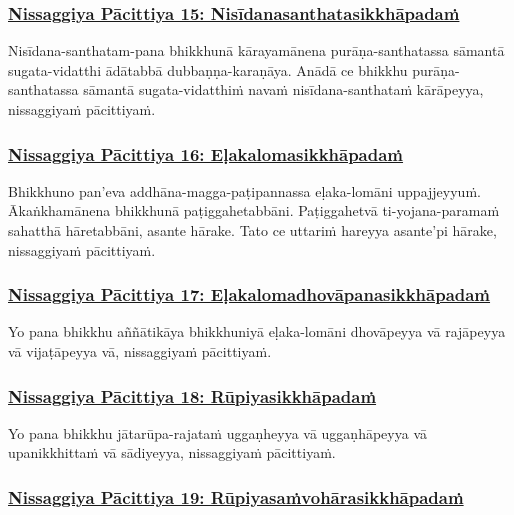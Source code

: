 \subsubsection*{\hyperref[forf-exp15]{Nissaggiya Pācittiya 15: Nisīdanasanthatasikkhāpadaṁ}}
\label{np15}

Nisīdana-santhatam-pana bhikkhunā kārayamānena purāṇa-santhatassa sāmantā sugata-vidatthi ādātabbā dubbaṇṇa-karaṇāya. Anādā ce bhikkhu purāṇa-santhatassa sāmantā sugata-vidatthiṁ navaṁ nisīdana-santhataṁ kārāpeyya, nissaggiyaṁ pācittiyaṁ.

\subsubsection*{\hyperref[forf-exp16]{Nissaggiya Pācittiya 16: Eḷakalomasikkhāpadaṁ}}
\label{np16}

Bhikkhuno pan’eva addhāna-magga-paṭipannassa eḷaka-lomāni uppajjeyyuṁ. Ākaṅkhamānena bhikkhunā paṭiggahetabbāni. Paṭiggahetvā ti-yojana-paramaṁ sahatthā hāretabbāni, asante hārake. Tato ce uttariṁ hareyya asante'pi hārake, nissaggiyaṁ pācittiyaṁ.

\subsubsection*{\hyperref[forf-exp17]{Nissaggiya Pācittiya 17: Eḷakalomadhovāpanasikkhāpadaṁ}}
\label{np17}

Yo pana bhikkhu aññātikāya bhikkhuniyā eḷaka-lomāni dhovāpeyya vā rajāpeyya vā vijaṭāpeyya vā, nissaggiyaṁ pācittiyaṁ.

\subsubsection*{\hyperref[forf-exp18]{Nissaggiya Pācittiya 18: Rūpiyasikkhāpadaṁ}}
\label{np18}

Yo pana bhikkhu jātarūpa-rajataṁ uggaṇheyya vā uggaṇhāpeyya vā upanikkhittaṁ vā sādiyeyya, nissaggiyaṁ pācittiyaṁ.

\subsubsection*{\hyperref[forf-exp19]{Nissaggiya Pācittiya 19: Rūpiyasaṁvohārasikkhāpadaṁ}}
\label{np19}


